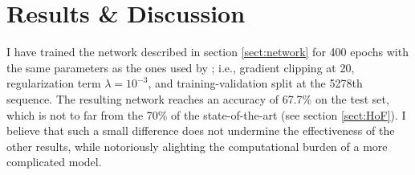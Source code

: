 \chapter{Results \& Discussion} \label{Chapter: Results}







I have trained the network described in section \ref{sect:network} for 400 epochs with the same parameters as the ones used by \cite{Jurtz2017}; i.e., gradient clipping at 20, regularization term $\lambda=10^{-3}$, and training-validation split at the 5278th sequence. The resulting network reaches an accuracy of 67.7\% on the test set, which is not to far from the 70\% of the state-of-the-art (see section \ref{sect:HoF}). I believe that such a small difference does not undermine the effectiveness of the other results, while notoriously alighting the computational burden of a more complicated model.

